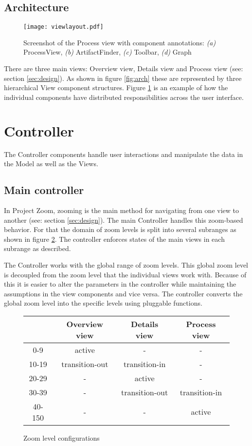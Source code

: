 \subsection{Architecture}

\begin{figure}
\texttt{[image: viewlayout.pdf]}
\caption[Screenshot of the Process view with component annotations]{Screenshot of the Process view with component annotations: \textit{(a)} ProcessView, \textit{(b)} ArtifactFinder, \textit{(c)} Toolbar, \textit{(d)} Graph}
\label{fig:viewlayout}
\end{figure}

There are three main views: Overview view, Details view and Process view (see: section \ref{sec:design}). As shown in figure \ref{fig:arch} these are represented by three hierarchical View component structures. Figure \ref{fig:viewlayout} is an example of how the individual components have distributed responsibilities across the user interface.

\section{Controller}

The Controller components handle user interactions and manipulate the data in the Model as well as the Views. 

\subsection{Main controller}
In Project Zoom, zooming is the main method for navigating from one view to another (see: section \ref{sec:design}). The main Controller handles this zoom-based behavior. For that the domain of zoom levels is split into several subranges as shown in figure \ref{fig:zoomtable}. The controller enforces states of the main views in each subrange as described.

The Controller works with the global range of zoom levels. This global zoom level is decoupled from the zoom level that the individual views work with. Because of this it is easier to alter the parameters in the controller while maintaining the assumptions in the view components and vice versa. The controller converts the global zoom level into the specific levels using pluggable functions.

\begin{figure}
\begin{center}
\begin{tabular}{|c|c|c|c|}
\hline
& Overview view & Details view & Process view \\ \hline
0-9 & active & - & - \\
10-19 & transition-out & transition-in & - \\
20-29 & - & active & - \\
30-39 & - & transition-out & transition-in \\
40-150 & - & - & active \\ \hline
\end{tabular}
\end{center}
\caption{Zoom level configurations}
\label{fig:zoomtable}
\end{figure}

